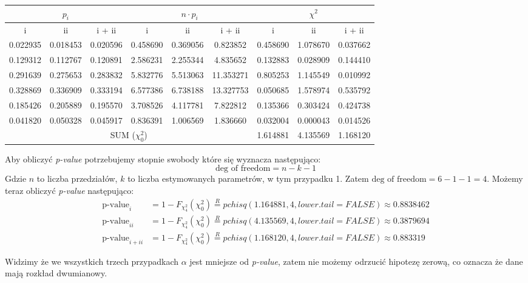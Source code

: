 \documentclass{article}
\begin{document}
\begin{center} \begin{tabular}{|c|c|c|c|c|c|c|c|c|} \hline
\multicolumn{3}{|c|}{$p_i$} & \multicolumn{3}{|c|}{$n \cdot p_i$} & \multicolumn{3}{|c|}{$\chi^2$} \\ \hline
i & ii & i + ii & i & ii & i + ii & i & ii & i + ii \\ \hline
0.022935 & 0.018453 & 0.020596 & 0.458690 & 0.369056 &	0.823852 & 0.458690 & 1.078670 &	0.037662 \\ \hline
0.129312 & 0.112767	& 0.120891 & 2.586231 & 2.255344 &	4.835652 & 0.132883	& 0.028909 &	0.144410 \\ \hline
0.291639 & 0.275653	& 0.283832 & 5.832776 & 5.513063 &	11.353271 & 0.805253 & 1.145549 &	0.010992 \\ \hline
0.328869 & 0.336909	& 0.333194 & 6.577386 & 6.738188 &	13.327753	 & 0.050685 & 1.578974 &	0.535792 \\ \hline
0.185426 & 0.205889	& 0.195570 & 3.708526 & 4.117781 &	7.822812 & 0.135366	& 0.303424 &	0.424738 \\ \hline
0.041820 & 0.050328	& 0.045917 & 0.836391 & 1.006569 &	1.836660 & 0.032004	& 0.000043 &	0.014526 \\ \hline
\multicolumn{6}{|c|}{SUM ($\chi^2_0$)} & 1.614881 & 4.135569 &	1.168120 \\ \hline
\end{tabular} \end{center}

Aby obliczyć \textit{p-value} potrzebujemy stopnie swobody które się wyznacza następująco:
\[ \text{deg of freedom} = n - k - 1 \]
Gdzie $n$ to liczba przedziałów, $k$ to liczba estymowanych parametrów, w tym przypadku 1. Zatem $\text{deg of freedom} = 6 - 1 - 1 = 4$. Możemy teraz obliczyć \textit{p-value} następująco:
\begin{align*}
\text{p-value}_i & = 1 - F_{\chi^2_4}(\chi^2_0) \overset{R}{=} pchisq(1.164881, 4, lower.tail = FALSE) \approx 0.8838462 \\
\text{p-value}_{ii} & = 1 - F_{\chi^2_4}(\chi^2_0) \overset{R}{=} pchisq(4.135569, 4, lower.tail = FALSE) \approx 0.3879694 \\
\text{p-value}_{i + ii} & = 1 - F_{\chi^2_4}(\chi^2_0) \overset{R}{=} pchisq(1.168120, 4, lower.tail = FALSE) \approx 0.883319 
\end{align*}

Widzimy że we wszystkich trzech przypadkach $\alpha$ jest mniejsze od \textit{p-value}, zatem nie możemy odrzucić hipotezę zerową, co oznacza że dane mają rozkład dwumianowy.
\end{document}
